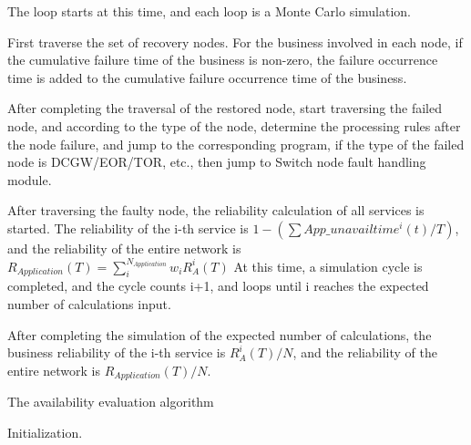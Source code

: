 \documentclass[journal]{IEEEtran}
\begin{document}
    The loop starts at this time, and each loop is a Monte Carlo simulation.

    First traverse the set of recovery nodes. For the business involved in each node, if the cumulative failure time of the business is non-zero, the failure occurrence time is added to the cumulative failure occurrence time of the business.

    After completing the traversal of the restored node, start traversing the failed node, and according to the type of the node, determine the processing rules after the node failure, and jump to the corresponding program, if the type of the failed node is DCGW/EOR/TOR, etc., then jump to Switch node fault handling module.

    After traversing the faulty node, the reliability calculation of all services is started. The reliability of the i-th service is $1-(\sum App\_unavailtime^i(t)/T)$, and the reliability of the entire network is $R_{Application}(T)=\sum_i^{N_{Application}}w_iR_A ^i(T)$ At this time, a simulation cycle is completed, and the cycle counts i+1, and loops until i reaches the expected number of calculations input.

    After completing the simulation of the expected number of calculations, the business reliability of the i-th service is $R_A^i(T)/N$, and the reliability of the entire network is $R_{Application}(T)/N$.
    
    \begin{algorithm}[t]
    	\caption{The availability evaluation algorithm}
    	\label{algo:event}
    	\LinesNumbered
    	Initialization. \;
    \end{algorithm}
\end{document}
